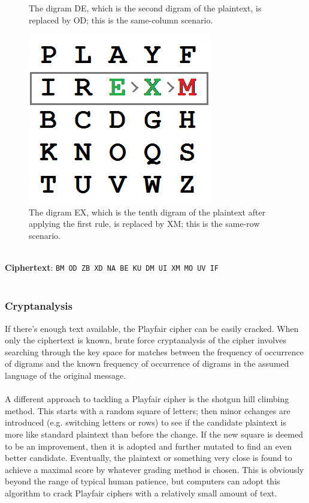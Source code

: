 \documentclass[Lau,binding=0.6cm,oneside]{sapthesis}
\begin{document}
\begin{figure}[H]
  \caption{The digram DE, which is the second digram of the plaintext, is replaced by OD; this is the same-column scenario.}
\endminipage\hfill
{}%
  \includegraphics[width=\linewidth]{playfair_10}
  \caption{The digram EX, which is the tenth digram of the plaintext after applying the first rule, is replaced by XM; this is the same-row scenario.}
\endminipage
\end{figure}
\ \\
\textbf{Ciphertext}: \colorbox{gray!12}{\small{\texttt{BM OD ZB XD NA BE KU DM UI XM MO UV IF}}}\\\\

\subsubsection{Cryptanalysis}
If there's enough text available, the Playfair cipher can be easily cracked. When only the ciphertext is known, brute force cryptanalysis of the cipher involves searching through the key space for matches between the frequency of occurrence of digrams and the known frequency of occurrence of digrams in the assumed language of the original message.\\\\
A different approach to tackling a Playfair cipher is the shotgun hill climbing method. This starts with a random square of letters; then minor cchanges are introduced (e.g. switching letters or rows) to see if the candidate plaintext is more like standard plaintext than before the change. If the new square is deemed to be an improvement, then it is adopted and further mutated to find an even better candidate. Eventually, the plaintext or something very close is found to achieve a maximal score by whatever grading method is chosen. This is obviously beyond the range of typical human patience, but computers can adopt this algorithm to crack Playfair ciphers with a relatively small amount of text.\\\\
\end{document}
